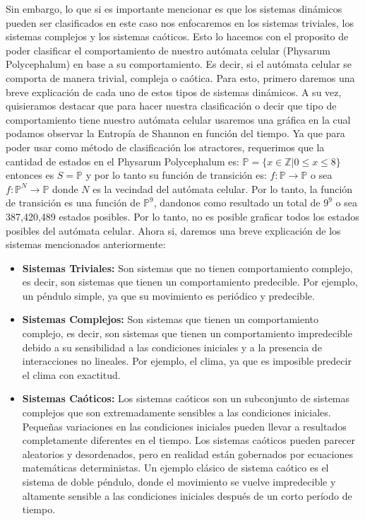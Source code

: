         Sin embargo, lo que si es importante mencionar es que los sistemas din\'amicos pueden ser clasificados
        en este caso nos enfocaremos en los sistemas triviales, los sistemas complejos y los sistemas ca\'oticos.
    \vskip 0.5cm
    Esto lo hacemos con el proposito de poder clasificar el comportamiento de nuestro aut\'omata celular (Physarum Polycephalum)
        en base a su comportamiento. Es decir, si el aut\'omata celular se comporta de manera trivial, compleja o ca\'otica.
        Para esto, primero daremos una breve explicaci\'on de cada uno de estos tipos de sistemas din\'amicos. A su vez, 
        quisieramos destacar que para hacer nuestra clasificaci\'on o decir que tipo de comportamiento tiene nuestro aut\'omata
        celular usaremos una gr\'afica en la cual podamos observar la Entrop\'ia de Shannon en funci\'on del tiempo. Ya que para
        poder usar como m\'etodo de clasificaci\'on los atractores, requerimos que la cantidad de estados en el Physarum Polycephalum
        es: $\mathbb{P} = \{x \in \mathbb{Z}| 0 \leq x \leq 8\}$ entonces es $S = \mathbb{P}$ y por lo tanto su funci\'on de transici\'on es: 
        $f: \mathbb{P} \rightarrow \mathbb{P}$ o sea $f: \mathbb{P}^{N} \rightarrow \mathbb{P}$ donde $N$ es la vecindad del aut\'omata celular.
        Por lo tanto, la funci\'on de transici\'on es una funci\'on de $\mathbb{P}^{9}$, 
        dandonos como resultado un total de $9^{9}$ o sea 387,420,489 estados posibles. Por lo tanto, no es posible graficar todos los
        estados posibles del aut\'omata celular.
    \vskip 0.5cm
    Ahora si, daremos una breve explicaci\'on de los sistemas mencionados anteriormente:
    \begin{itemize}
        \item \textbf{Sistemas Triviales:} Son sistemas que no tienen comportamiento complejo, es decir, son sistemas que
            tienen un comportamiento predecible. Por ejemplo, un p\'endulo simple, ya que su movimiento es peri\'odico y predecible.
        \item \textbf{Sistemas Complejos:} Son sistemas que tienen un comportamiento complejo, es decir, son sistemas que
            tienen un comportamiento impredecible debido a su sensibilidad a las condiciones iniciales y a la presencia de interacciones no 
            lineales.  Por ejemplo, el clima, ya que es imposible predecir el clima con exactitud.
        \item \textbf{Sistemas Ca\'oticos:} Los sistemas ca\'oticos son un subconjunto de sistemas complejos que son extremadamente sensibles 
            a las condiciones iniciales. Peque\~nas variaciones en las condiciones iniciales pueden llevar a resultados completamente diferentes en el
            tiempo. Los sistemas ca\'oticos pueden parecer aleatorios y desordenados, pero en realidad est\'an gobernados por ecuaciones matem\'aticas 
            deterministas. Un ejemplo cl\'asico de sistema ca\'otico es el sistema de doble p\'endulo, donde el movimiento se vuelve impredecible y 
            altamente sensible a las condiciones iniciales despu\'es de un corto per\'iodo de tiempo.
    \end{itemize}
